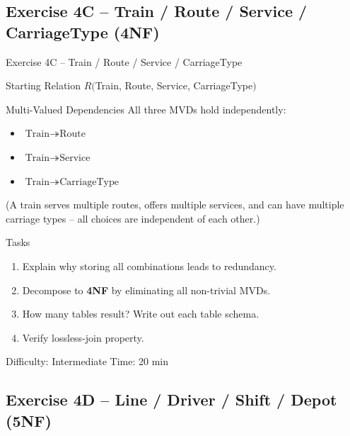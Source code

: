 \documentclass[10pt]{beamer}
\begin{document}
\subsection{Exercise 4C -- Train / Route / Service / CarriageType (4NF)}

\begin{frame}{Exercise 4C -- Train / Route / Service / CarriageType}
  \begin{block}{Starting Relation}
    $R($Train, Route, Service, CarriageType$)$
  \end{block}

  \begin{block}{Multi-Valued Dependencies}
    All three MVDs hold independently:
    \begin{itemize}
      \item $\text{Train} \twoheadrightarrow \text{Route}$
      \item $\text{Train} \twoheadrightarrow \text{Service}$
      \item $\text{Train} \twoheadrightarrow \text{CarriageType}$
    \end{itemize}
    (A train serves multiple routes, offers multiple services, and can have multiple carriage types -- all choices are independent of each other.)
  \end{block}

  \begin{block}{Tasks}
    \begin{enumerate}
      \item Explain why storing all combinations leads to redundancy.
      \item Decompose to \textbf{4NF} by eliminating all non-trivial MVDs.
      \item How many tables result?  Write out each table schema.
      \item Verify lossless-join property.
    \end{enumerate}
  \end{block}

  \begin{alertblock}{Difficulty: Intermediate \quad Time: 20 min}
  \end{alertblock}
\end{frame}

\subsection{Exercise 4D -- Line / Driver / Shift / Depot (5NF)}
\end{document}
